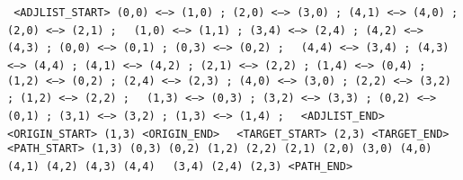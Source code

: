 \colorbox[RGB]{ 217,210,233 }{ \texttt{ <ADJLIST\_START> (0,0) <--> (1,0) ; (2,0) <--> (3,0) ; (4,1) <--> (4,0) ; (2,0) <--> (2,1) ; }} 
\colorbox[RGB]{ 217,210,233 }{ \texttt{ (1,0) <--> (1,1) ; (3,4) <--> (2,4) ; (4,2) <--> (4,3) ; (0,0) <--> (0,1) ; (0,3) <--> (0,2) ; }}
\colorbox[RGB]{ 217,210,233 }{ \texttt{ (4,4) <--> (3,4) ; (4,3) <--> (4,4) ; (4,1) <--> (4,2) ; (2,1) <--> (2,2) ; (1,4) <--> (0,4) ; }}
\colorbox[RGB]{ 217,210,233 }{ \texttt{ (1,2) <--> (0,2) ; (2,4) <--> (2,3) ; (4,0) <--> (3,0) ; (2,2) <--> (3,2) ; (1,2) <--> (2,2) ; }} 
\colorbox[RGB]{ 217,210,233 }{ \texttt{ (1,3) <--> (0,3) ; (3,2) <--> (3,3) ; (0,2) <--> (0,1) ; (3,1) <--> (3,2) ; (1,3) <--> (1,4) ; }}
\colorbox[RGB]{ 217,210,233 }{ \texttt{ <ADJLIST\_END> } } \colorbox[RGB]{ 217,234,211 }{ \texttt{ <ORIGIN\_START> (1,3) <ORIGIN\_END> } } 
\colorbox[RGB]{ 234,209,220 }{ \texttt{ <TARGET\_START> (2,3) <TARGET\_END> } } 
\colorbox[RGB]{ 207,226,243 }{ \texttt{ <PATH\_START> (1,3) (0,3) (0,2) (1,2) (2,2) (2,1) (2,0) (3,0) (4,0) (4,1) (4,2) (4,3) (4,4) }}
\colorbox[RGB]{ 207,226,243 }{ \texttt{ (3,4) (2,4) (2,3) <PATH\_END> } } \\